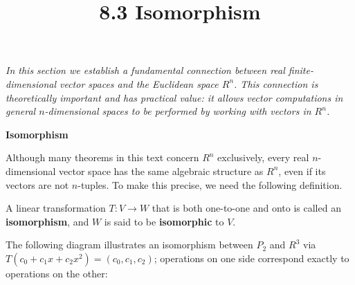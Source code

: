 \documentclass{article}
\title{8.3 Isomorphism}
\date{}
\author{}
\newcommand{\redheading}[1]{{\vspace{2mm}\noindent\Large\bfseries\color{red!55!black} #1\par}\vspace{2mm}}
\begin{document}
\maketitle

{\itshape\color{blue!45!black}
In this section we establish a fundamental connection between real finite-dimensional vector
spaces and the Euclidean space $R^n$. This connection is theoretically important and has
practical value: it allows vector computations in general $n$-dimensional spaces to be
performed by working with vectors in $R^n$.\par}

\vspace{2mm}

\redheading{Isomorphism}

Although many theorems in this text concern $R^n$ exclusively, every real $n$-dimensional
vector space has the same algebraic structure as $R^n$, even if its vectors are not
$n$-tuples. To make this precise, we need the following definition.

\begin{tcolorbox}[colback=teal!4, colframe=teal!65!black,
  title={\textbf{Definition 1}}, boxrule=0.5mm, arc=3mm]
A linear transformation $T : V \to W$ that is both one-to-one and onto is called an
\textbf{isomorphism}, and $W$ is said to be \textbf{isomorphic} to $V$.
\end{tcolorbox}

The following diagram illustrates an isomorphism between $P_2$ and $R^3$ via
$T(c_0+c_1x+c_2x^2) = (c_0,c_1,c_2)$; operations on one side correspond exactly to
operations on the other:

\vspace{2mm}
\begin{center}
\end{center}
\vspace{2mm}
\end{document}
